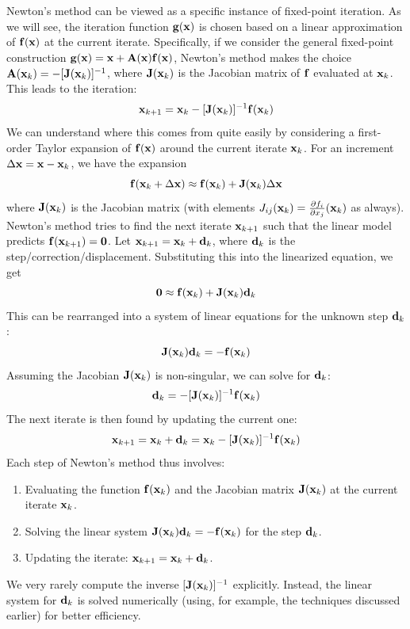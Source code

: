Newton's method can be viewed as a specific instance of fixed-point iteration. As we will see, the iteration function $\mathbf{g}(\mathbf{x})$ is chosen based on a linear approximation of $\mathbf{f}(\mathbf{x})$ at the current iterate. Specifically, if we consider the general fixed-point construction $\mathbf{g}(\mathbf{x}) = \mathbf{x} + \mathbf{A}(\mathbf{x})\mathbf{f}(\mathbf{x})$, Newton's method makes the choice $\mathbf{A}(\mathbf{x}_k) = -[\mathbf{J}(\mathbf{x}_k)]^{-1}$, where $\mathbf{J}(\mathbf{x}_k)$ is the Jacobian matrix of $\mathbf{f}$ evaluated at $\mathbf{x}_k$. This leads to the iteration:
\[
    \mathbf{x}_{k+1} = \mathbf{x}_k - [\mathbf{J}(\mathbf{x}_k)]^{-1} \mathbf{f}(\mathbf{x}_k)
\]
We can understand where this comes from quite easily by considering a first-order Taylor expansion of $\mathbf{f}(\mathbf{x})$ around the current iterate $\mathbf{x}_k$. For an increment $\Delta\mathbf{x} = \mathbf{x} - \mathbf{x}_k$, we have the expansion
\[
    \mathbf{f}(\mathbf{x}_k + \Delta\mathbf{x}) \approx \mathbf{f}(\mathbf{x}_k) + \mathbf{J}(\mathbf{x}_k) \Delta\mathbf{x}
\]
where $\mathbf{J}(\mathbf{x}_k)$ is the Jacobian matrix (with elements $J_{ij}(\mathbf{x}_k) = \tfrac{\partial f_i}{\partial x_j}(\mathbf{x}_k)$ as always). Newton's method tries to find the next iterate $\mathbf{x}_{k+1}$ such that the linear model predicts $\mathbf{f}(\mathbf{x}_{k+1}) = \mathbf{0}$. Let $\mathbf{x}_{k+1} = \mathbf{x}_k + \mathbf{d}_k$, where $\mathbf{d}_k$ is the step/correction/displacement. Substituting this into the linearized equation, we get
\[
    \mathbf{0} \approx \mathbf{f}(\mathbf{x}_k) + \mathbf{J}(\mathbf{x}_k) \mathbf{d}_k
\]
This can be rearranged into a system of linear equations for the unknown step $\mathbf{d}_k$:
\[
    \mathbf{J}(\mathbf{x}_k) \mathbf{d}_k = -\mathbf{f}(\mathbf{x}_k)
\]
Assuming the Jacobian $\mathbf{J}(\mathbf{x}_k)$ is non-singular, we can solve for $\mathbf{d}_k$:
\[
    \mathbf{d}_k = -[\mathbf{J}(\mathbf{x}_k)]^{-1} \mathbf{f}(\mathbf{x}_k)
\]
The next iterate is then found by updating the current one:
\[
    \mathbf{x}_{k+1} = \mathbf{x}_k + \mathbf{d}_k = \mathbf{x}_k - [\mathbf{J}(\mathbf{x}_k)]^{-1} \mathbf{f}(\mathbf{x}_k)
\]
Each step of Newton's method thus involves:
\begin{enumerate}
    \item Evaluating the function $\mathbf{f}(\mathbf{x}_k)$ and the Jacobian matrix $\mathbf{J}(\mathbf{x}_k)$ at the current iterate $\mathbf{x}_k$.
    \item Solving the linear system $\mathbf{J}(\mathbf{x}_k)\mathbf{d}_k = -\mathbf{f}(\mathbf{x}_k)$ for the step $\mathbf{d}_k$.
    \item Updating the iterate: $\mathbf{x}_{k+1} = \mathbf{x}_k + \mathbf{d}_k$.
\end{enumerate}
We very rarely compute the inverse $[\mathbf{J}(\mathbf{x}_k)]^{-1}$ explicitly. Instead, the linear system for $\mathbf{d}_k$ is solved numerically (using, for example, the techniques discussed earlier) for better efficiency.

